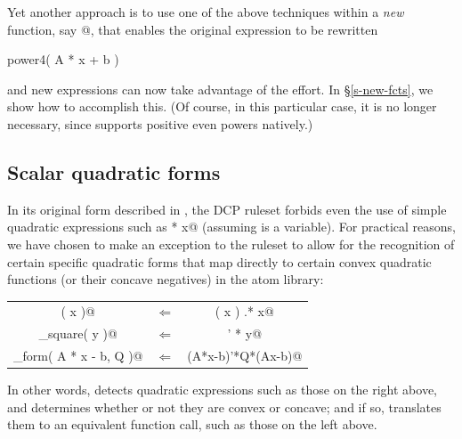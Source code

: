 \documentclass[12pt]{article}
\begin{document}
Yet another approach is to use one of the above techniques within
a \emph{new} function, say @, that enables the original
expression to be rewritten
\begin{code}
	power4( A * x + b )
\end{code}
and new expressions can now take advantage of the effort.
In \S\ref{s-new-fcts}, we show how to accomplish this. (Of course,
in this particular case, it is no longer necessary, since \cvx
supports positive even powers natively.)

\subsection{Scalar quadratic forms}
\label{sec:quadforms}


In its original form described in \cite{Gra:04,GBY},
the DCP ruleset forbids even the use of simple
quadratic expressions such as \verb@x * x@ (assuming \verb@x@ is a variable).
For practical reasons, we have chosen to make an exception to the ruleset to 
allow for the recognition of certain specific quadratic forms that map
directly to certain convex quadratic functions (or their concave negatives)
in the \cvx atom library:
\begin{center}
	\begin{tabular}{ccc}
	\verb@square( x )@ & $\Longleftarrow$ & \verb@conj( x ) .* x@ \\
	\verb@sum_square( y )@ & $\Longleftarrow$ & \verb@y' * y@ \\
	\verb@quad_form( A * x - b, Q )@ & $\Longleftarrow$ &  \verb@(A*x-b)'*Q*(Ax-b)@
	\end{tabular}
\end{center}
In other words, \cvx detects quadratic expressions
such as those on the right above, and determines whether or not they
are convex or concave; and if so, translates them to an equivalent
function call, such as those on the left above.
\end{document}
